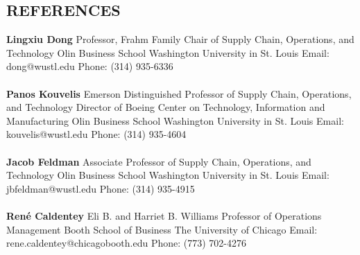\documentclass[margin, 10pt]{res} %
\begin{document}
\begin{resume}
\section{REFERENCES}
{\bf Lingxiu Dong} 
\newline Professor, Frahm Family Chair of Supply Chain, Operations, and Technology 
\newline Olin Business School
\newline Washington University in St. Louis
\newline Email: dong@wustl.edu
\newline Phone: (314) 935-6336\\
~
\\
{\bf Panos Kouvelis} 
\newline Emerson Distinguished Professor of
Supply Chain, Operations, and Technology
\newline Director of Boeing Center on
Technology, Information and Manufacturing
\newline Olin Business School
\newline Washington University in St. Louis
\newline Email: kouvelis@wustl.edu
\newline Phone: (314) 935-4604\\
~
\\
{\bf Jacob Feldman} 
\newline Associate Professor of Supply Chain, Operations, and Technology
\newline Olin Business School
\newline Washington University in St. Louis
\newline Email: jbfeldman@wustl.edu
\newline Phone: (314) 935-4915\\
~
\\
{\bf Ren\'{e} Caldentey} 
\newline Eli B. and Harriet B. Williams Professor of Operations Management
\newline Booth School of Business
\newline The University of Chicago
\newline Email: rene.caldentey@chicagobooth.edu
\newline Phone: (773) 702-4276\\
\end{resume}
\end{document}
